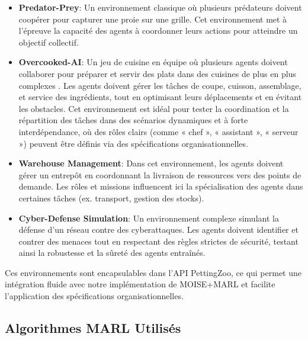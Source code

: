 \documentclass[sigconf,anonymous]{aamas}
\begin{document}
\begin{itemize}
    \item \textbf{Predator-Prey}: Un environnement classique où plusieurs prédateurs doivent coopérer pour capturer une proie sur une grille. Cet environnement met à l'épreuve la capacité des agents à coordonner leurs actions pour atteindre un objectif collectif.

    \item \textbf{Overcooked-AI}: Un jeu de cuisine en équipe où plusieurs agents doivent collaborer pour préparer et servir des plats dans des cuisines de plus en plus complexes \cite{overcookedai}. Les agents doivent gérer les tâches de coupe, cuisson, assemblage, et service des ingrédients, tout en optimisant leurs déplacements et en évitant les obstacles. Cet environnement est idéal pour tester la coordination et la répartition des tâches dans des scénarios dynamiques et à forte interdépendance, où des rôles clairs (comme « chef », « assistant », « serveur ») peuvent être définis via des spécifications organisationnelles.
    
    
    \item \textbf{Warehouse Management}: Dans cet environnement, les agents doivent gérer un entrepôt en coordonnant la livraison de ressources vers des points de demande. Les rôles et missions influencent ici la spécialisation des agents dans certaines tâches (ex. transport, gestion des stocks).
    
    \item \textbf{Cyber-Defense Simulation}: Un environnement complexe simulant la défense d'un réseau contre des cyberattaques. Les agents doivent identifier et contrer des menaces tout en respectant des règles strictes de sécurité, testant ainsi la robustesse et la sûreté des agents entraînés.
\end{itemize}

Ces environnements sont encapsulables dans l'API PettingZoo, ce qui permet une intégration fluide avec notre implémentation de MOISE+MARL et facilite l'application des spécifications organisationnelles.

\subsection{Algorithmes MARL Utilisés}
\end{document}
